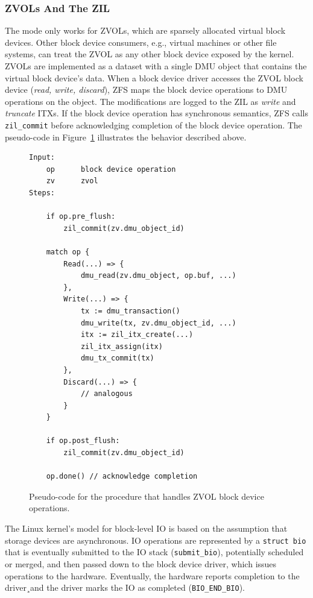 \documentclass[12pt,a4paper,twoside]{book}
\begin{document}
{\subsubsection{ZVOLs And The ZIL}\label{sec:itxgbypass:openzfsbackground_zvols}
The mode only works for ZVOLs, which are sparsely allocated virtual block devices.
Other block device consumers, e.g., virtual machines or other file systems, can treat the ZVOL as any other block device exposed by the kernel.
ZVOLs are implemented as a dataset with a single DMU object that contains the virtual block device's data.
When a block device driver accesses the ZVOL block device (\textit{read, write, discard}), ZFS maps the block device operations to DMU operations on the object.
The modifications are logged to the ZIL as \textit{write} and \textit{truncate} ITXs.
If the block device operation has synchronous semantics, ZFS calls \lstinline{zil_commit} before acknowledging completion of the block device operation.
The pseudo-code in Figure~\ref{fig:itxg_bypass_zvol:pseudocode:upstream} illustrates the behavior described above.

\begin{figure}[H]
\begin{lstlisting}[style=figurepseudocode]
Input:
    op      block device operation
    zv      zvol
Steps:

    if op.pre_flush:
        zil_commit(zv.dmu_object_id)

    match op {
        Read(...) => {
            dmu_read(zv.dmu_object, op.buf, ...)
        },
        Write(...) => {
            tx := dmu_transaction()
            dmu_write(tx, zv.dmu_object_id, ...)
            itx := zil_itx_create(...)
            zil_itx_assign(itx)
            dmu_tx_commit(tx)
        },
        Discard(...) => {
            // analogous
        }
    }

    if op.post_flush:
        zil_commit(zv.dmu_object_id)

    op.done() // acknowledge completion

\end{lstlisting}
\caption{Pseudo-code for the procedure that handles ZVOL block device operations.}
\label{fig:itxg_bypass_zvol:pseudocode:upstream}
\end{figure}

The Linux kernel's model for block-level IO is based on the assumption that storage devices are asynchronous.
IO operations are represented by a \lstinline[style=figurepseudocode]{struct bio} that is eventually submitted to the IO stack (\lstinline{submit_bio}), potentially scheduled or merged, and then passed down to the block device driver, which issues operations to the hardware.
Eventually, the hardware reports completion to the driver¸and the driver marks the IO as completed (\lstinline{BIO_END_BIO}).

}
\end{document}

